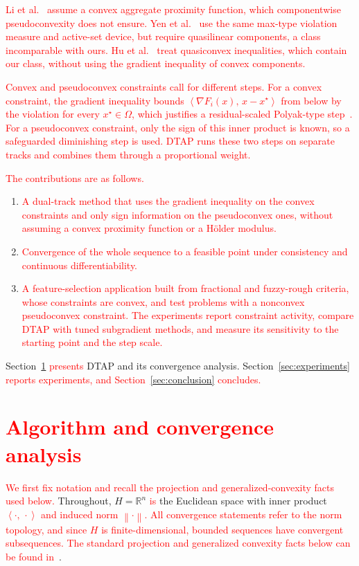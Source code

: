 \documentclass[]{interact}
\theoremstyle{plain}
\theoremstyle{definition}
\theoremstyle{remark}
\newcommand{\R}{\mathbb{R}}
\newcommand{\norm}[1]{\left\lVert #1 \right\rVert}
\newcommand{\inner}[2]{\left\langle #1,\, #2 \right\rangle}
\newcommand{\dtap}{\textsc{DTAP}}
\begin{document}
\leavevmode\textcolor{red}{Li et al.~\citep{li2013nsfp} assume a convex aggregate proximity function, which componentwise pseudoconvexity does not ensure. Yen et al.~\citep{yen2019} use the same max-type violation measure and active-set device, but require quasilinear components, a class incomparable with ours. Hu et al.~\citep{hu2022quasi} treat quasiconvex inequalities, which contain our class, without using the gradient inequality of convex components.}

\leavevmode\textcolor{red}{Convex and pseudoconvex constraints call for different steps. For a convex constraint, the gradient inequality bounds $\inner{\nabla F_i(x)}{x-x^\star}$ from below by the violation for every $x^\star\in\Omega$, which justifies a residual-scaled Polyak-type step~\citep{polyak1969,lopez2012}. For a pseudoconvex constraint, only the sign of this inner product is known, so a safeguarded diminishing step is used. DTAP runs these two steps on separate tracks and combines them through a proportional weight.}

\leavevmode\textcolor{red}{The contributions are as follows.}
\begin{enumerate}[label=\textbf{C\arabic*.},leftmargin=2.4em,itemsep=3pt]
\item \leavevmode\textcolor{red}{A dual-track method that uses the gradient inequality on the convex constraints and only sign information on the pseudoconvex ones, without assuming a convex proximity function or a H\"older modulus.}
\item \leavevmode\textcolor{red}{Convergence of the whole sequence to a feasible point under consistency and continuous differentiability.}
\item \leavevmode\textcolor{red}{A feature-selection application built from fractional and fuzzy-rough criteria, whose constraints are convex, and test problems with a nonconvex pseudoconvex constraint. The experiments report constraint activity, compare DTAP with tuned subgradient methods, and measure its sensitivity to the starting point and the step scale.}
\end{enumerate}

Section~\leavevmode\textcolor{red}{\ref{sec:convergence} presents} \dtap{} and its convergence analysis. Section~\leavevmode\textcolor{red}{\ref{sec:experiments} reports experiments, and Section~\ref{sec:conclusion} concludes.}


\section{\textcolor{red}{Algorithm and convergence analysis}}\label{sec:convergence}
\leavevmode\textcolor{red}{We first fix notation and recall the projection and generalized-convexity facts used below.}
Throughout, $H=\R^n$ \leavevmode\textcolor{red}{is} the Euclidean space with inner product \leavevmode\textcolor{red}{$\inner{\cdot}{\cdot}$ and induced norm $\norm{\cdot}$. All convergence statements refer to the norm topology, and since $H$ is finite-dimensional, bounded sequences have convergent subsequences. The standard projection and generalized convexity facts below can be found in~\citep{bauschke2011,mangasarian1994}}.
\end{document}
